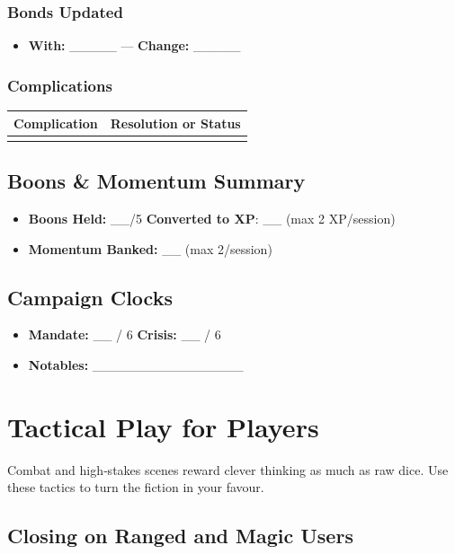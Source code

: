 \subsubsection*{Bonds Updated}
\begin{itemize}
  \item \textbf{With:} \_\_\_\_\_ — \textbf{Change:} \_\_\_\_\_
\end{itemize}
\subsubsection*{Complications}
\begin{tabular}{|p{5cm}|p{5cm}|}
\hline
\textbf{Complication} & \textbf{Resolution or Status} \\
\hline
 &  \\
\hline
\end{tabular}

\subsection{Boons \& Momentum Summary}
\begin{itemize}
  \item \textbf{Boons Held:} \_\_/5 \quad \textbf{Converted to XP}: \_\_ (max 2 XP/session)
  \item \textbf{Momentum Banked:} \_\_ (max 2/session)
\end{itemize}

\subsection{Campaign Clocks}
\begin{itemize}
  \item \textbf{Mandate:} \_\_ / 6 \qquad \textbf{Crisis:} \_\_ / 6
  \item \textbf{Notables:} \_\_\_\_\_\_\_\_\_\_\_\_\_\_\_\_
\end{itemize}

\section{Tactical Play for Players}
\label{sec:tactical-play}

Combat and high‑stakes scenes reward clever thinking as much as raw dice. Use these tactics to turn the fiction in your favour.

\subsection{Closing on Ranged and Magic Users}

